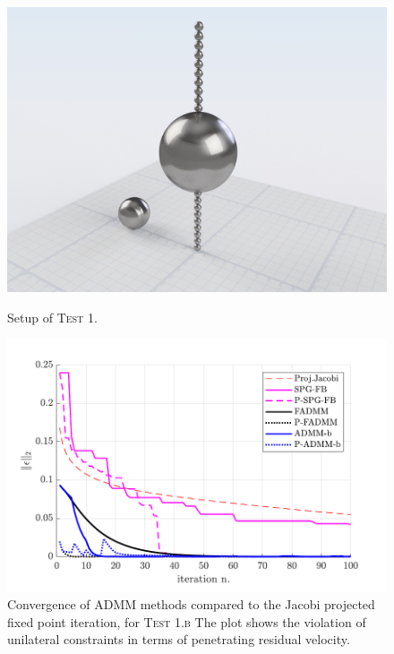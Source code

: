 \documentclass[final,3p]{elsarticle}
\begin{document}
\begin{figure}[!tbp]
  \centering
  \begin{minipage}[t]{0.48\textwidth}
    \includegraphics[width=\textwidth]{pics/t6_snapshot.png}
    \caption{Setup of \textsc{Test 1}.}
		\label{fig:t6_snapshot}
  \end{minipage}
  \hfill
  \begin{minipage}[t]{0.48\textwidth}
    \includegraphics[width=\textwidth]{pics/t6_convergence_b.pdf}
    \caption{Convergence of ADMM methods compared to the Jacobi projected fixed point iteration, for \textsc{Test 1.b} 
		The plot shows the violation of unilateral constraints in terms of penetrating residual velocity. }
		\label{fig:t6_convergence_b}
  \end{minipage}
\end{figure}
\end{document}
